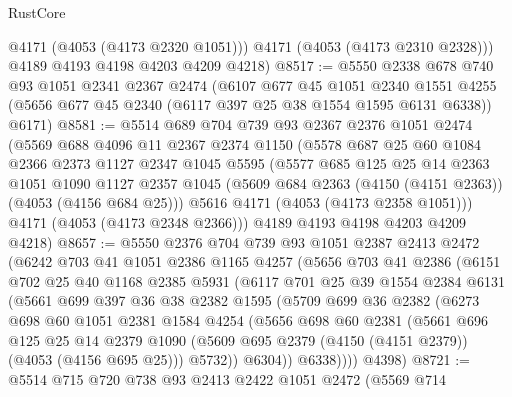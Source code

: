 \begin{lexlean}{RustCore}
\begin{coremodule}
          @4171
          (@4053 (@4173 @2320 @1051)))
        @4171
        (@4053 (@4173 @2310 @2328)))
      @4189
      @4193
      @4198
      @4203
      @4209
      @4218)
@8517 := @5550
    @2338
    @678
    @740
    @93
    @1051
    @2341
    @2367
    @2474
    (@6107
      @677
      @45
      @1051
      @2340
      @1551
      @4255
      (@5656 @677 @45 @2340 (@6117 @397 @25 @38 @1554 @1595 @6131 @6338))
      @6171)
@8581 := @5514
    @689
    @704
    @739
    @93
    @2367
    @2376
    @1051
    @2474
    (@5569
      @688
      @4096
      @11
      @2367
      @2374
      @1150
      (@5578
        @687
        @25
        @60
        @1084
        @2366
        @2373
        @1127
        @2347
        @1045
        @5595
        (@5577
          @685
          @125
          @25
          @14
          @2363
          @1051
          @1090
          @1127
          @2357
          @1045
          (@5609 @684 @2363 (@4150 (@4151 @2363)) (@4053 (@4156 @684 @25)))
          @5616
          @4171
          (@4053 (@4173 @2358 @1051)))
        @4171
        (@4053 (@4173 @2348 @2366)))
      @4189
      @4193
      @4198
      @4203
      @4209
      @4218)
@8657 := @5550
    @2376
    @704
    @739
    @93
    @1051
    @2387
    @2413
    @2472
    (@6242
      @703
      @41
      @1051
      @2386
      @1165
      @4257
      (@5656
        @703
        @41
        @2386
        (@6151
          @702
          @25
          @40
          @1168
          @2385
          @5931
          (@6117
            @701
            @25
            @39
            @1554
            @2384
            @6131
            (@5661
              @699
              @397
              @36
              @38
              @2382
              @1595
              (@5709
                @699
                @36
                @2382
                (@6273
                  @698
                  @60
                  @1051
                  @2381
                  @1584
                  @4254
                  (@5656
                    @698
                    @60
                    @2381
                    (@5661
                      @696
                      @125
                      @25
                      @14
                      @2379
                      @1090
                      (@5609 @695 @2379 (@4150 (@4151 @2379)) (@4053 (@4156 @695 @25)))
                      @5732))
                  @6304))
              @6338))))
      @4398)
@8721 := @5514
    @715
    @720
    @738
    @93
    @2413
    @2422
    @1051
    @2472
    (@5569
      @714

\end{coremodule}
\end{lexlean}
